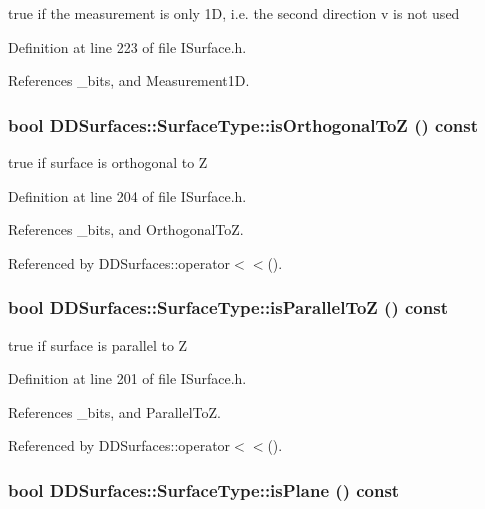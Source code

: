 true if the measurement is only 1D, i.e. the second direction v is not used 

Definition at line 223 of file ISurface.h.

References \_\-bits, and Measurement1D.\hypertarget{class_d_d_surfaces_1_1_surface_type_ad1281857fc34ed032d61b5aa975afa56}{
\subsubsection[{isOrthogonalToZ}]{\setlength{\rightskip}{0pt plus 5cm}bool DDSurfaces::SurfaceType::isOrthogonalToZ () const}}
\label{class_d_d_surfaces_1_1_surface_type_ad1281857fc34ed032d61b5aa975afa56}


true if surface is orthogonal to Z 

Definition at line 204 of file ISurface.h.

References \_\-bits, and OrthogonalToZ.

Referenced by DDSurfaces::operator$<$$<$().\hypertarget{class_d_d_surfaces_1_1_surface_type_a87e9f2fdb6fa369cd54178d5e40e5f14}{
\subsubsection[{isParallelToZ}]{\setlength{\rightskip}{0pt plus 5cm}bool DDSurfaces::SurfaceType::isParallelToZ () const}}
\label{class_d_d_surfaces_1_1_surface_type_a87e9f2fdb6fa369cd54178d5e40e5f14}


true if surface is parallel to Z 

Definition at line 201 of file ISurface.h.

References \_\-bits, and ParallelToZ.

Referenced by DDSurfaces::operator$<$$<$().\hypertarget{class_d_d_surfaces_1_1_surface_type_a6ac9158e037fe074f564bfc34d9f8f6d}{
\subsubsection[{isPlane}]{\setlength{\rightskip}{0pt plus 5cm}bool DDSurfaces::SurfaceType::isPlane () const}}
\label{class_d_d_surfaces_1_1_surface_type_a6ac9158e037fe074f564bfc34d9f8f6d}



